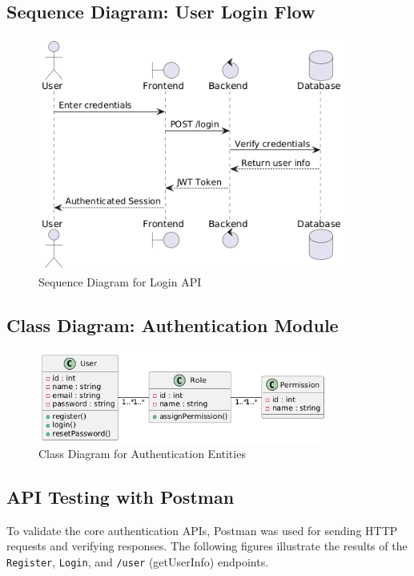 \subsection{Sequence Diagram: User Login Flow}
\begin{figure}[H]
    \centering
    \includegraphics[width=0.9\textwidth]{chapters/chapter 3/figures/sequence_DG_Auth.png}
    \caption{Sequence Diagram for Login API}
    \label{fig:sprint0_sequence}
\end{figure}

\subsection{Class Diagram: Authentication Module}
\begin{figure}[H]
    \centering
    \includegraphics[width=0.85\textwidth]{chapters/chapter 3/figures/class_diagram.png}
    \caption{Class Diagram for Authentication Entities}
    \label{fig:sprint0_class}
\end{figure}

\subsection{API Testing with Postman}
To validate the core authentication APIs, Postman was used for sending HTTP requests and verifying responses. The following figures illustrate the results of the \texttt{Register}, \texttt{Login}, and \texttt{/user} (getUserInfo) endpoints.

